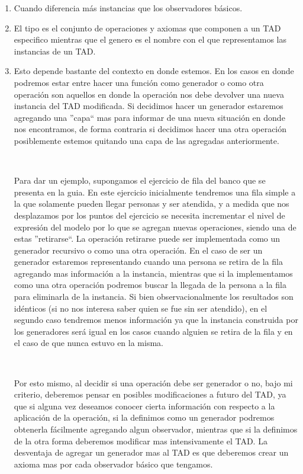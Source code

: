 \documentclass[10pt, a4paper]{article}
\begin{document}
\begin{enumerate}
 \item Cuando diferencia m\'as instancias que los observadores b\'asicos.
 \item El tipo es el conjunto de operaciones y axiomas que componen a un TAD especifico mientras que el genero es el nombre con el que representamos las instancias de un TAD.
 \item Esto depende bastante del contexto en donde estemos. En los casos en donde podremos estar entre hacer una funci\'on como generador o como otra operaci\'on son aquellos en donde la operaci\'on nos debe devolver una nueva instancia del TAD modificada. Si decidimos hacer un generador estaremos agregando una ''capa`` mas para informar de una nueva situaci\'on en donde nos encontramos, de forma contraria si decidimos hacer una otra operaci\'on posiblemente estemos quitando una capa de las agregadas anteriormente. 
 
 ~
 
 Para dar un ejemplo, supongamos el ejercicio de fila del banco que se presenta en la guia. En este ejercicio inicialmente tendremos una fila simple a la que solamente pueden llegar personas y ser atendida, y a medida que nos desplazamos por los puntos del ejercicio se necesita incrementar el nivel de expresi\'on del modelo por lo que se agregan nuevas operaciones, siendo una de estas ''retirarse``. La operaci\'on retirarse puede ser implementada como un generador recursivo o como una otra operaci\'on. En el caso de ser un generador estaremos representando cuando una persona se retira de la fila agregando mas informaci\'on a la instancia, mientras que si la implementamos como una otra operaci\'on podremos buscar la llegada de la persona a la fila para eliminarla de la instancia. Si bien observacionalmente los resultados son id\'enticos (si no nos interesa saber quien se fue sin ser atendido), en el segundo caso tendremos menos informaci\'on ya que la instancia construida por los generadores ser\'a igual en los casos 
cuando alguien se retira de la fila y en el caso de que nunca estuvo en la misma.
 
 ~
 
 Por esto mismo, al decidir si una operaci\'on debe ser generador o no, bajo mi criterio, deberemos pensar en posibles modificaciones a futuro del TAD, ya que si alguna vez deseamos conocer cierta informaci\'on con respecto a la aplicaci\'on de la operaci\'on, si la definimos como un generador podremos obtenerla f\'acilmente agregando algun observador, mientras que si la definimos de la otra forma deberemos modificar mas intensivamente el TAD. La desventaja de agregar un generador mas al TAD es que deberemos crear un axioma mas por cada observador b\'asico que tengamos. 
\end{enumerate}
\end{document}
